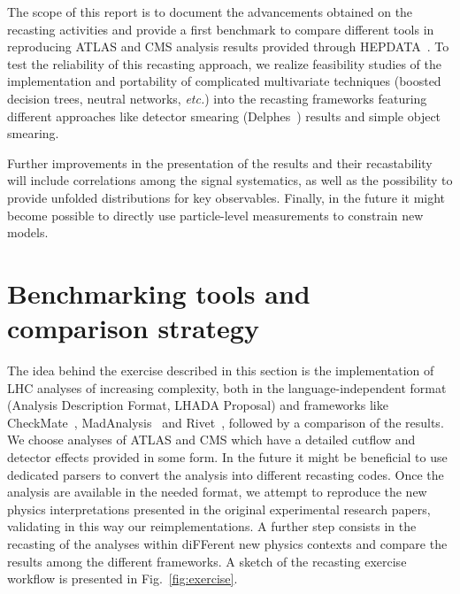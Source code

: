 \documentclass[11pt]{cernrep}
\begin{document}
The scope of this report is to document the advancements obtained on the recasting
activities and provide a first benchmark to compare different tools in reproducing ATLAS and CMS analysis results
provided through HEPDATA~\cite{Maguire:2017ypu}.
To test the reliability of this recasting approach, we realize feasibility studies of the implementation and portability of complicated multivariate techniques
(boosted decision trees, neutral networks, {\it etc.}) into the recasting frameworks featuring different approaches 
like detector smearing (Delphes~\cite{deFavereau:2013fsa}) results and simple object smearing.

Further improvements in the presentation of the results and their recastability
will include correlations among the signal systematics, 
as well as the possibility to provide unfolded distributions for key observables.
Finally, in the future it might become possible to directly use particle-level measurements to constrain new models.


\section{Benchmarking tools and comparison strategy}

The idea behind the exercise described in this section is the implementation of
LHC analyses of increasing complexity, both in the language-independent format
(Analysis Description Format, LHADA Proposal) and frameworks like
CheckMate~\cite{Drees:2013wra,Cacciari:2005hq},
MadAnalysis~\cite{Conte:2012fm,Conte:2014zja,Dumont:2014tja}
and Rivet~\cite{Waugh:2006ip,Buckley:2010ar}, followed by a comparison of the results.
We choose analyses of ATLAS and CMS which have a detailed cutflow and detector effects provided in some form.
In the future it might be beneficial to use dedicated parsers to convert the analysis into different recasting codes.
Once the analysis are available in the needed format, we attempt to reproduce the new physics
interpretations presented in the original experimental research papers,
validating in this way our reimplementations.
A further step consists in the recasting of the analyses within diFFerent new
physics contexts and compare the results among the different frameworks.
A sketch of the recasting exercise workflow is presented in Fig.~\ref{fig:exercise}.
\end{document}
